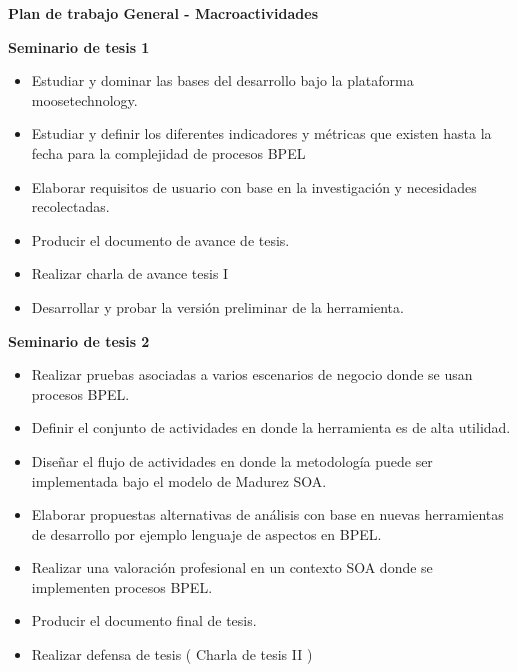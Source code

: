 \documentclass[spanish]{article}
\begin{document}
\textbf{Plan de trabajo General - Macroactividades}

\textbf{Seminario de tesis 1} 
\begin{itemize}
\item Estudiar y dominar las bases del desarrollo bajo la plataforma moosetechnology. 
\item Estudiar y definir los diferentes indicadores y métricas que existen
hasta la fecha para la complejidad de procesos BPEL 
\item Elaborar requisitos de usuario con base en la investigación y necesidades
recolectadas. 
\item Producir el documento de avance de tesis. 
\item Realizar charla de avance tesis I 
\item Desarrollar y probar la versión preliminar de la herramienta. 
\end{itemize}
\textbf{Seminario de tesis 2} 
\begin{itemize}
\item Realizar pruebas asociadas a varios escenarios de negocio donde se
usan procesos BPEL. 
\item Definir el conjunto de actividades en donde la herramienta es de alta
utilidad. 
\item Diseñar el flujo de actividades en donde la metodología puede ser
implementada bajo el modelo de Madurez SOA. 
\item Elaborar propuestas alternativas de análisis con base en nuevas herramientas
de desarrollo por ejemplo lenguaje de aspectos en BPEL. 
\item Realizar una valoración profesional en un contexto SOA donde se implementen
procesos BPEL. 
\item Producir el documento final de tesis. 
\item Realizar defensa de tesis ( Charla de tesis II ) 
\end{itemize}
 

 
\end{document}
